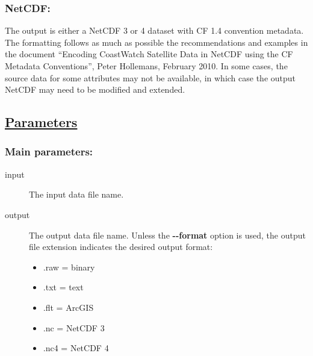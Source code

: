 \subsubsection*{NetCDF:}


 The output is either a NetCDF 3 or 4 dataset with CF 1.4 convention metadata. The formatting follows as much as possible the recommendations and examples in the document ``Encoding CoastWatch Satellite Data in NetCDF using the CF Metadata Conventions'', Peter Hollemans, February 2010. In some cases, the source data for some attributes may not be available, in which case the output NetCDF may need to be modified and extended.
\subsection*{\underline{Parameters}}
\subsubsection*{Main parameters:}
\begin{description}
\item[ input ] The input data file name. 
\item[ output ] The output data file name. Unless the \textbf{-{-}format}
 option is used, the output file extension indicates the desired output format: \begin{itemize}
\item .raw = binary
\item .txt = text
\item .flt = ArcGIS
\item .nc = NetCDF 3
\item .nc4 = NetCDF 4

\end{itemize}


\end{description}
